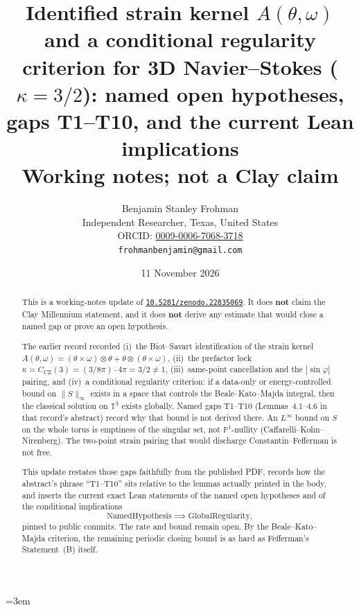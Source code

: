 \documentclass[11pt]{article}
\title{Identified strain kernel \(A(\theta,\omega)\) and a conditional regularity criterion for 3D Navier--Stokes (\(\kappa=3/2\)): named open hypotheses, gaps T1--T10, and the current Lean implications\\
\large Working notes; not a Clay claim}
\author{Benjamin Stanley Frohman\\
Independent Researcher, Texas, United States\\
ORCID: \href{https://orcid.org/0009-0006-7068-3718}{0009-0006-7068-3718}\\
\texttt{frohmanbenjamin@gmail.com}}
\date{11 November 2026}
\theoremstyle{plain}
\theoremstyle{definition}
\theoremstyle{remark}
\newcommand{\Tthree}{\mathbb{T}^{3}}
\newcommand{\doi}[1]{\href{https://doi.org/#1}{\texttt{#1}}}
\begin{document}
\emergencystretch=3em
\maketitle

\begin{abstract}
This is a working-notes update of \doi{10.5281/zenodo.22835069}. It does \textbf{not} claim the Clay Millennium statement, and it does \textbf{not} derive any estimate that would close a named gap or prove an open hypothesis.

The earlier record recorded (i)~the Biot--Savart identification of the strain kernel \(A(\theta,\omega)=(\theta\times\omega)\otimes\theta+\theta\otimes(\theta\times\omega)\), (ii)~the prefactor lock \(\kappa=C_{\mathrm{CZ}}(3)=(3/8\pi)\cdot 4\pi=3/2\neq 1\), (iii)~same-point cancellation and the \(|\sin\varphi|\) pairing, and (iv)~a conditional regularity criterion: if a data-only or energy-controlled bound on \(\|S\|_{\infty}\) exists in a space that controls the Beale--Kato--Majda integral, then the classical solution on \(\Tthree\) exists globally. Named gaps T1--T10 (Lemmas~4.1--4.6 in that record's abstract) record why that bound is not derived there. An \(L^{\infty}\) bound on \(S\) on the whole torus is emptiness of the singular set, not \(\mathbb{P}^{1}\)-nullity (Caffarelli--Kohn--Nirenberg). The two-point strain pairing that would discharge Constantin--Fefferman is not free.

This update restates those gaps faithfully from the published PDF, records how the abstract's phrase ``T1--T10'' sits relative to the lemmas actually printed in the body, and inserts the current exact Lean statements of the named open hypotheses and of the conditional implications
\[
\text{NamedHypothesis}\implies\text{GlobalRegularity},
\]
pinned to public commits. The rate and bound remain open. By the Beale--Kato--Majda criterion, the remaining periodic closing bound is as hard as Fefferman's Statement~(B) itself.
\end{abstract}

\noindent
{}
\end{document}
